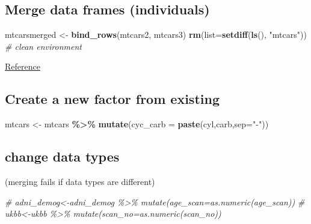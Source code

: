 \documentclass[
]{article}
\newenvironment{Shaded}{\begin{snugshade}}{\end{snugshade}}
\newcommand{\AttributeTok}[1]{\textcolor[rgb]{0.13,0.29,0.53}{#1}}
\newcommand{\CommentTok}[1]{\textcolor[rgb]{0.56,0.35,0.01}{\textit{#1}}}
\newcommand{\FunctionTok}[1]{\textcolor[rgb]{0.13,0.29,0.53}{\textbf{#1}}}
\newcommand{\NormalTok}[1]{#1}
\newcommand{\OtherTok}[1]{\textcolor[rgb]{0.56,0.35,0.01}{#1}}
\newcommand{\SpecialCharTok}[1]{\textcolor[rgb]{0.81,0.36,0.00}{\textbf{#1}}}
\newcommand{\StringTok}[1]{\textcolor[rgb]{0.31,0.60,0.02}{#1}}
\begin{document}
\hypertarget{merge-data-frames-individuals}{%
\subsection{Merge data frames (individuals)}\label{merge-data-frames-individuals}}

\begin{Shaded}
\begin{Highlighting}[]
\NormalTok{mtcarsmerged }\OtherTok{\textless{}{-}} \FunctionTok{bind\_rows}\NormalTok{(mtcars2, mtcars3)}
\FunctionTok{rm}\NormalTok{(}\AttributeTok{list=}\FunctionTok{setdiff}\NormalTok{(}\FunctionTok{ls}\NormalTok{(), }\StringTok{"mtcars"}\NormalTok{)) }\CommentTok{\# clean environment}
\end{Highlighting}
\end{Shaded}

\href{https://dplyr.tidyverse.org/reference/bind.html}{Reference}

\hypertarget{create-a-new-factor-from-existing}{%
\subsection{Create a new factor from existing}\label{create-a-new-factor-from-existing}}

\begin{Shaded}
\begin{Highlighting}[]
\NormalTok{mtcars }\OtherTok{\textless{}{-}}\NormalTok{ mtcars }\SpecialCharTok{\%\textgreater{}\%} \FunctionTok{mutate}\NormalTok{(}\AttributeTok{cyc\_carb =} \FunctionTok{paste}\NormalTok{(cyl,carb,}\AttributeTok{sep=}\StringTok{"{-}"}\NormalTok{))}
\end{Highlighting}
\end{Shaded}

\hypertarget{change-data-types}{%
\subsection{change data types}\label{change-data-types}}

(merging fails if data types are different)

\begin{Shaded}
\begin{Highlighting}[]
\CommentTok{\# adni\_demog\textless{}{-}adni\_demog \%\textgreater{}\% mutate(age\_scan=as.numeric(age\_scan))}
\CommentTok{\# ukbb\textless{}{-}ukbb \%\textgreater{}\% mutate(scan\_no=as.numeric(scan\_no))}
\end{Highlighting}
\end{Shaded}
\end{document}

